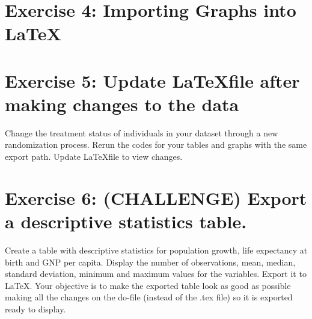 \documentclass[12pts]{report}
\begin{document}
\section*{Exercise 4: Importing Graphs into \LaTeX}

\section*{Exercise 5: Update \LaTeX\space file after making changes to the data}
Change the treatment status of individuals in your dataset through a new randomization process. Rerun the codes for your tables and graphs with the same export path. Update \LaTeX file to view changes.

\section*{Exercise 6: (CHALLENGE) Export a descriptive statistics table.}
Create a table with descriptive statistics for population growth, life expectancy at birth and GNP per capita. Display the number of observations, mean, median, standard deviation, minimum and maximum values for the variables. Export it to \LaTeX. Your objective is to make the exported table look as good as possible making all the changes on the do-file (instead of the .tex file) so it is exported ready to display.
\end{document}
